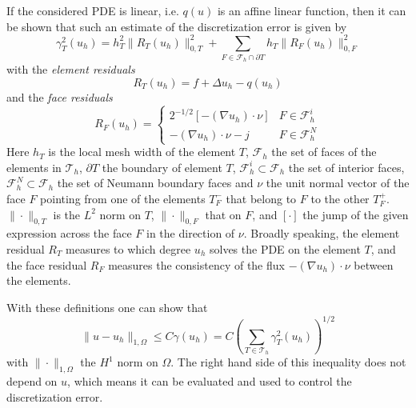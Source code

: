 \documentclass[a4paper,12pt]{article}
\begin{document}
If the considered PDE is linear, i.e. $q(u)$ is an affine linear function, then it can be shown
\cite{Eriksson,AinsworthOden}
that such an estimate of the discretization error is given by
\begin{equation*}
  \gamma_T^2(u_h) = h_T^2 \| R_T(u_h) \|_{0,T}^2 + \sum_{F \in \mathcal{F}_h \cap \partial T} h_T \| R_F(u_h) \|_{0,F}^2
\end{equation*}
with the \emph{element residuals}
\begin{equation*}
  R_T(u_h) = f + \Delta u_h - q(u_h)
\end{equation*}
and the \emph{face residuals}
\begin{equation*}
  R_F(u_h) = \begin{cases} 2^{-1/2} [-(\nabla u_h) \cdot \nu] & F \in \mathcal{F}_h^i \\ - (\nabla u_h) \cdot \nu - j & F \in \mathcal{F}_h^N \end{cases}
\end{equation*}
Here $h_T$ is the local mesh width of the element $T$, $\mathcal{F}_h$ the set of faces of the elements
in $\mathcal{T}_h$, $\partial T$ the boundary of element $T$, $\mathcal{F}_h^i \subset \mathcal{F}_h$
the set of interior faces, $\mathcal{F}_h^N \subset \mathcal{F}_h$ the set of Neumann boundary faces and
$\nu$ the unit normal vector of the face $F$ pointing from one of the elements $T_F^-$ that belong to
$F$ to the other $T_F^+$. $\|\cdot\|_{0,T}$ is the $L^2$ norm on $T$, $\|\cdot\|_{0,F}$ that on $F$,
and $[\cdot]$ the jump of the given expression across the face $F$ in the direction of $\nu$. Broadly
speaking, the element residual $R_T$ measures to which degree $u_h$ solves the PDE on the element $T$,
and the face residual $R_F$ measures the consistency of the flux $-(\nabla u_h)\cdot \nu$ between the
elements. 

With these definitions one can show that
\begin{equation*}
  \|u - u_h\|_{1,\Omega} \leq C \gamma(u_h) = C \left( \sum_{T \in {\mathcal T}_h} \gamma_T^2(u_h) \right)^{1/2}
\end{equation*}
with $\|\cdot\|_{1,\Omega}$ the $H^1$ norm on $\Omega$. The right hand side of this inequality does not
depend on $u$, which means it can be evaluated and used to control the discretization error.
\end{document}
